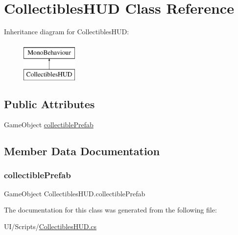 \hypertarget{class_collectibles_h_u_d}{}\section{Collectibles\+H\+UD Class Reference}
\label{class_collectibles_h_u_d}
Inheritance diagram for Collectibles\+H\+UD\+:\begin{figure}[H]
\begin{center}
\leavevmode
\includegraphics[height=2.000000cm]{class_collectibles_h_u_d}
\end{center}
\end{figure}
\subsection*{Public Attributes}
\begin{DoxyCompactItemize}
\item 
Game\+Object \mbox{\hyperlink{class_collectibles_h_u_d_a8efba92e9ade27747b33fb5e4d95db18}{collectible\+Prefab}}
\end{DoxyCompactItemize}


\subsection{Member Data Documentation}
\mbox{\label{class_collectibles_h_u_d_a8efba92e9ade27747b33fb5e4d95db18}} 
\subsubsection{\texorpdfstring{collectible\+Prefab}{collectiblePrefab}}
{\footnotesize\ttfamily Game\+Object Collectibles\+H\+U\+D.\+collectible\+Prefab}



The documentation for this class was generated from the following file\+:\begin{DoxyCompactItemize}
\item 
U\+I/\+Scripts/\mbox{\hyperlink{_collectibles_h_u_d_8cs}{Collectibles\+H\+U\+D.\+cs}}\end{DoxyCompactItemize}

